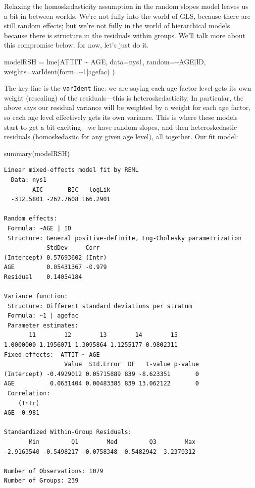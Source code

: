 \documentclass[
  letterpaper,
  DIV=11,
  numbers=noendperiod]{scrreprt}
\newenvironment{Shaded}{}{}
\newcommand{\AttributeTok}[1]{\textcolor[rgb]{0.49,0.56,0.16}{#1}}
\newcommand{\DecValTok}[1]{\textcolor[rgb]{0.25,0.63,0.44}{#1}}
\newcommand{\FunctionTok}[1]{\textcolor[rgb]{0.02,0.16,0.49}{#1}}
\newcommand{\NormalTok}[1]{#1}
\newcommand{\OtherTok}[1]{\textcolor[rgb]{0.00,0.44,0.13}{#1}}
\newcommand{\SpecialCharTok}[1]{\textcolor[rgb]{0.25,0.44,0.63}{#1}}
\begin{document}
Relaxing the homoskedasticity assumption in the random slopes model
leaves us a bit in between worlds. We're not fully into the world of
GLS, because there are still random effects; but we're not fully in the
world of hierarchical models because there is structure in the residuals
within groups. We'll talk more about this compromise below; for now,
let's just do it.

\begin{Shaded}
\begin{Highlighting}[]
\NormalTok{modelRSH }\OtherTok{=} \FunctionTok{lme}\NormalTok{(ATTIT }\SpecialCharTok{\textasciitilde{}}\NormalTok{ AGE, }
              \AttributeTok{data=}\NormalTok{nys1,}
              \AttributeTok{random=}\SpecialCharTok{\textasciitilde{}}\NormalTok{AGE}\SpecialCharTok{|}\NormalTok{ID,}
              \AttributeTok{weights=}\FunctionTok{varIdent}\NormalTok{(}\AttributeTok{form=}\SpecialCharTok{\textasciitilde{}}\DecValTok{1}\SpecialCharTok{|}\NormalTok{agefac) )}
\end{Highlighting}
\end{Shaded}

The key line is the \texttt{varIdent} line: we are saying each age
factor level gets its own weight (rescaling) of the residuals---this is
heteroskedasticity. In particular, the above says our residual variance
will be weighted by a weight for each age factor, so each age level
effectively gets its own variance. This is where these models start to
get a bit exciting---we have random slopes, and then heteroskedastic
residuals (homoskedastic for any given age level), all together. Our fit
model:

\begin{Shaded}
\begin{Highlighting}[]
\FunctionTok{summary}\NormalTok{(modelRSH)}
\end{Highlighting}
\end{Shaded}

\begin{verbatim}
Linear mixed-effects model fit by REML
  Data: nys1 
        AIC       BIC   logLik
  -312.5801 -262.7608 166.2901

Random effects:
 Formula: ~AGE | ID
 Structure: General positive-definite, Log-Cholesky parametrization
            StdDev     Corr  
(Intercept) 0.57693602 (Intr)
AGE         0.05431367 -0.979
Residual    0.14054184       

Variance function:
 Structure: Different standard deviations per stratum
 Formula: ~1 | agefac 
 Parameter estimates:
       11        12        13        14        15 
1.0000000 1.1956071 1.3095864 1.1255177 0.9802311 
Fixed effects:  ATTIT ~ AGE 
                 Value  Std.Error  DF   t-value p-value
(Intercept) -0.4929012 0.05715889 839 -8.623351       0
AGE          0.0631404 0.00483385 839 13.062122       0
 Correlation: 
    (Intr)
AGE -0.981

Standardized Within-Group Residuals:
       Min         Q1        Med         Q3        Max 
-2.9163540 -0.5498217 -0.0758348  0.5482942  3.2370312 

Number of Observations: 1079
Number of Groups: 239 
\end{verbatim}
\end{document}
